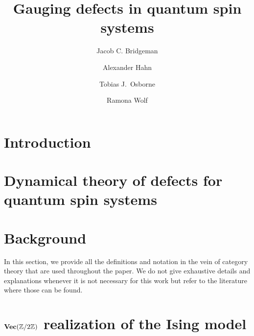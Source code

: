 

\title{Gauging defects in quantum spin systems}
\author{Jacob C. Bridgeman}
\author{Alexander Hahn}
\author{Tobias J.\ Osborne}
\author{Ramona Wolf}

\address{Perimeter Institute for Theoretical Physics, Waterloo, Ontario, Canada}
\address{Institut für Theoretische Physik, Leibniz Universität Hannover, Hannover, Germany}


\newcommand{\jcb}[1]{\textcolor{blue}{#1}}



\begin{abstract}
	
\end{abstract}

\maketitle



\tableofcontents
\newpage

\section{Introduction}


\section{Dynamical theory of defects for quantum spin systems}



\section{Background}\label{S:defs}
In this section, we provide all the definitions and notation in the vein of category theory that are used throughout the paper. We do not give exhaustive details and explanations whenever it is not necessary for this work but refer to the literature where those can be found.







\section{$\textbf{Vec}(\mathbb{Z}/2\mathbb{Z})$ realization of the Ising model}



